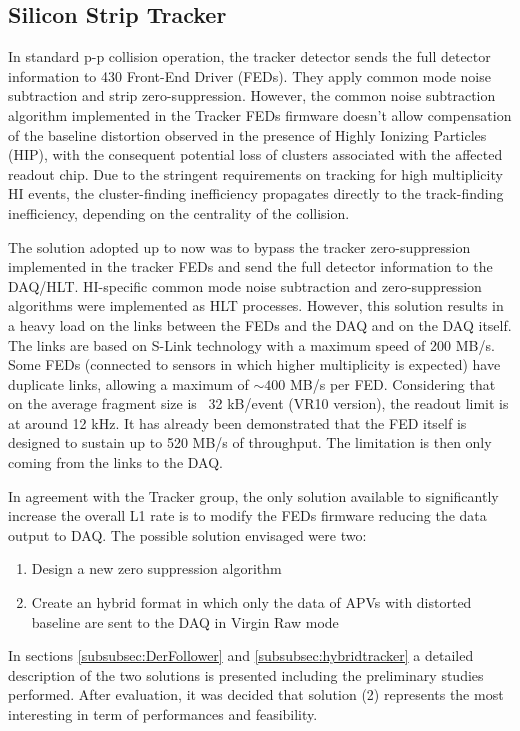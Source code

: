 \subsection{Silicon Strip Tracker\label{subsec:SiTracker}} 
In standard p-p collision operation, the tracker detector sends the full detector information to 430 Front-End Driver (FEDs). 
They apply common mode noise subtraction and strip zero-suppression. However, the common noise subtraction algorithm implemented in the Tracker FEDs firmware doesn't allow
compensation of the baseline distortion observed in the presence of Highly Ionizing Particles (HIP), with the consequent
potential loss of clusters associated with the affected readout chip. Due to the stringent requirements on tracking for
high multiplicity HI events, the cluster-finding inefficiency propagates directly to the track-finding inefficiency,
depending on the centrality of the collision.

The solution adopted up to now was to bypass the tracker zero-suppression implemented in the tracker FEDs and send the
full detector information to the DAQ/HLT. HI-specific common mode noise subtraction and zero-suppression algorithms were
implemented as HLT processes. However, this solution results in a heavy load on the links between the FEDs and the DAQ
and on the DAQ itself. The links are based on S-Link technology with a maximum speed of 200 MB/s. Some FEDs (connected
to sensors in which higher multiplicity is expected) have duplicate links, allowing a maximum of $\sim 400$ MB/s per
FED.  Considering that on the average fragment size is ~32 kB/event (VR10 version), the readout limit is at around 12 kHz. It has
already been demonstrated that the FED itself is designed to sustain up to 520 MB/s of throughput. The limitation is
then only coming from the links to the DAQ.

In agreement with the Tracker group, the only solution available to significantly increase the overall L1 rate is to
modify the FEDs firmware reducing the data output to DAQ. The possible solution envisaged were two:

\begin{enumerate}
\item Design a new zero suppression algorithm 
\item Create an hybrid format in which only the data of APVs with distorted baseline are sent to the DAQ in Virgin Raw mode 
\end{enumerate}

In sections \ref{subsubsec:DerFollower} and \ref{subsubsec:hybridtracker} a detailed description of the two solutions is presented including the preliminary studies performed. 
After evaluation, it was decided that solution (2) represents the most interesting in term of performances and feasibility. 

